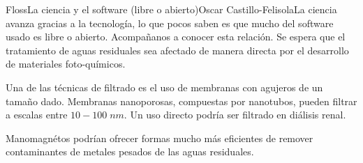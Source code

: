 \begin{article}[2]{Floss}{La ciencia y el software (libre o abierto)}{Oscar Castillo-Felisola}{La ciencia avanza gracias a la tecnolog\'ia, lo que pocos saben es que mucho del software usado es libre o abierto. Acompa\~nanos a conocer esta relaci\'on.}
Se espera que el tratamiento de aguas residuales sea afectado de manera directa por el desarrollo de materiales foto-qu\'imicos.


Una de las t\'ecnicas de filtrado es el uso de membranas con agujeros de un tama\~no dado.  Membranas nanoporosas, compuestas por nanotubos, pueden filtrar a escalas entre $10-100\;nm$. Un uso directo podr\'ia ser filtrado en di\'alisis renal.

Manomagn\'etos podr\'ian ofrecer formas mucho m\'as eficientes de remover contaminantes de metales pesados de las aguas residuales.











\begin{Quellen}
\end{Quellen}

\end{article}
